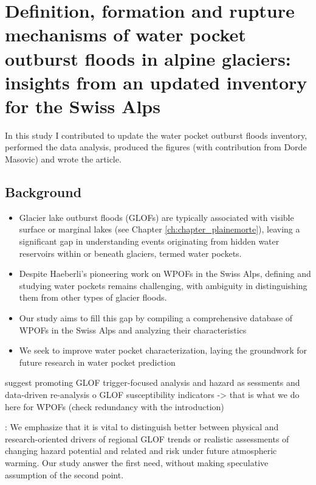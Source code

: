 \chapter{Definition, formation and rupture mechanisms of water pocket outburst floods in alpine glaciers: insights from an updated inventory for the Swiss Alps}
\label{ch:chapter_WPOFs}

In this study I contributed to update the water pocket outburst floods inventory, performed the data analysis, produced the figures (with contribution from Dorde Masovic) and wrote the article. 

\section{Background}

\begin{itemize}


        \item  Glacier lake outburst floods (GLOFs) are typically associated with visible surface or marginal lakes (see Chapter \ref{ch:chapter_plainemorte}), leaving a significant gap in understanding events originating from hidden water reservoirs within or beneath glaciers, termed water pockets.

        \item Despite Haeberli's pioneering work on WPOFs in the Swiss Alps, defining and studying water pockets remains challenging, with ambiguity in distinguishing them from other types of glacier floods.

        \item Our study aims to fill this gap by compiling a comprehensive database of WPOFs in the Swiss Alps and analyzing their characteristics

        \item We seek to improve water pocket characterization, laying the groundwork for future research in water pocket prediction

    \end{itemize}

    \cite{Emmer&al2022} suggest promoting GLOF trigger-focused analysis and hazard as sessments and data-driven re-analysis o GLOF susceptibility indicators -> that is what we do here for WPOFs (check redundancy with the introduction)

    \cite{Veh&al2022}: We emphasize that it is vital to distinguish better between physical and research-oriented drivers of regional GLOF trends or realistic assessments of changing hazard potential and related and risk under future atmospheric warming. Our study answer the first need, without making speculative assumption of the second point.